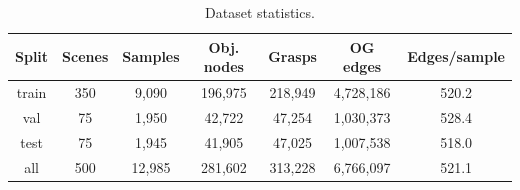 \begin{table}[htbp]
  \centering
  \caption{Dataset statistics.}
  \label{tab:stage1_dataset_stats}
  \small
  \setlength{\tabcolsep}{4.5pt}
  \begin{tabular}{ccccccc}
    \toprule
    Split & Scenes & Samples & Obj. nodes & Grasps & OG edges & Edges/sample \\
    \midrule
    train & 350 & 9,090 & 196,975 & 218,949 & 4,728,186 & 520.2 \\
    val & 75 & 1,950 & 42,722 & 47,254 & 1,030,373 & 528.4 \\
    test & 75 & 1,945 & 41,905 & 47,025 & 1,007,538 & 518.0 \\
    all & 500 & 12,985 & 281,602 & 313,228 & 6,766,097 & 521.1 \\
    \bottomrule
  \end{tabular}
\end{table}
